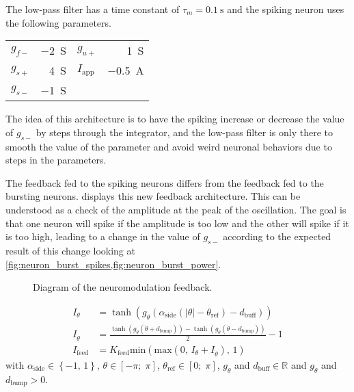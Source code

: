 The low-pass filter has a time constant of $\tau_m = \qty{0.1}{\second}$ and the spiking neuron uses the following parameters.
{

\large\centering
\begin{tabular}{lr|lr}
    $g_{f-}$    & \qty{-2}{\siemens}   & $g_{u+}$          & \qty{1}{\siemens}\\
    $g_{s+}$    & \qty{4}{\siemens}    & $I_\text{app}$    & \qty{-0.5}{\ampere}\\
    $g_{s-}$    & \qty{-1}{\siemens} & & 
\end{tabular}

}

The idea of this architecture is to have the spiking increase or decrease the value of $g_{s-}$ by steps through the integrator, and the low-pass filter is only there to smooth the value of the parameter and avoid weird neuronal behaviors due to steps in the parameters.

The feedback fed to the spiking neurons differs from the feedback fed to the bursting neurons.
 displays this new feedback architecture.
This can be understood as a check of the amplitude at the peak of the oscillation.
The goal is that one neuron will spike if the amplitude is too low and the other will spike if it is too high, leading to a change in the value of $g_{s-}$ according to the expected result of this change looking at \cref{fig:neuron_burst_spikes,fig:neuron_burst_power}.

\begin{figure}[!htbp]
    \centering
    \caption{Diagram of the neuromodulation feedback.}
    \label{fig:neuro_feed}
\end{figure}

\begin{align}
    I_\theta &= \tanh\left(g_\theta\left(\alpha_\text{side}\left(\left|\theta\right| - \theta_\text{ref}\right) - d_\text{buff}\right)\right)\\
    I_{\dot{\theta}} &= \frac{\tanh\left(g_{\dot{\theta}}\left(\dot{\theta}+d_\text{bump}\right)\right) -\tanh\left(g_{\dot{\theta}}\left(\dot{\theta}-d_\text{bump}\right)\right)}{2}-1\\
    I_\text{feed} &= K_\text{feed}\text{min}\left(\text{max}\left(0,\, I_\theta + I_{\dot{\theta}}\right),\, 1\right)
\end{align}
with $\alpha_\text{side} \in \left\{-1,\,1\right\}$, $\theta \in \left[-\pi;\;\pi\right]$, $\theta_\text{ref} \in \left[0;\;\pi\right]$, $g_\theta$ and $d_\text{buff} \in \mathbb{R}$ and $g_{\dot{\theta}}$ and $d_\text{bump} > 0$.

